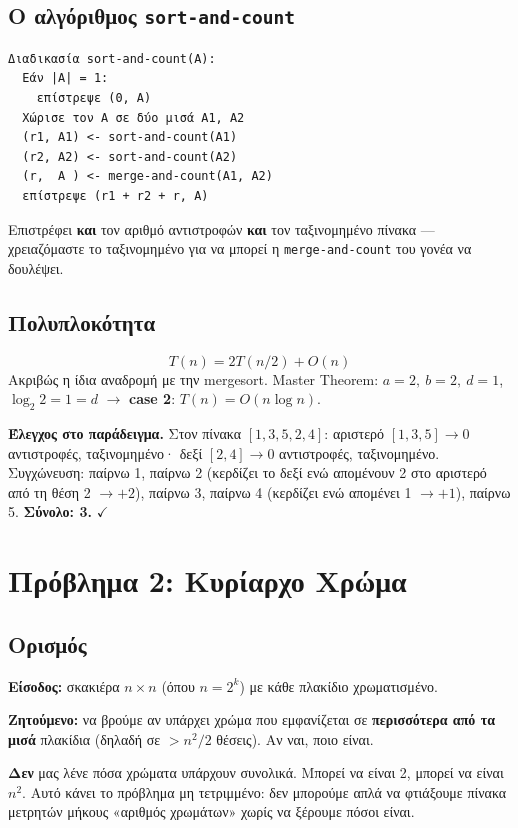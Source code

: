 \documentclass[11pt,a4paper]{article}
\begin{document}
\subsection{Ο αλγόριθμος \texttt{sort-and-count}}

\begin{codebox}
\begin{verbatim}
Διαδικασία sort-and-count(A):
  Εάν |A| = 1:
    επίστρεψε (0, A)
  Χώρισε τον A σε δύο μισά A1, A2
  (r1, A1) <- sort-and-count(A1)
  (r2, A2) <- sort-and-count(A2)
  (r,  A ) <- merge-and-count(A1, A2)
  επίστρεψε (r1 + r2 + r, A)
\end{verbatim}
\end{codebox}
Επιστρέφει \textbf{και} τον αριθμό αντιστροφών \textbf{και} τον ταξινομημένο
πίνακα --- χρειαζόμαστε το ταξινομημένο για να μπορεί η \texttt{merge-and-count}
του γονέα να δουλέψει.

\subsection{Πολυπλοκότητα}

\[
T(n) = 2 T(n/2) + O(n)
\]
Ακριβώς η ίδια αναδρομή με την mergesort. Master Theorem: $a = 2,\ b = 2,\
d = 1$, $\log_2 2 = 1 = d$ $\to$ \textbf{case 2}: $T(n) = O(n \log n)$.

\textbf{Έλεγχος στο παράδειγμα.} Στον πίνακα $[1, 3, 5, 2, 4]$: αριστερό
$[1, 3, 5] \to 0$ αντιστροφές, ταξινομημένο· δεξί $[2, 4] \to 0$ αντιστροφές,
ταξινομημένο. Συγχώνευση: παίρνω 1, παίρνω 2 (κερδίζει το δεξί ενώ απομένουν 2
στο αριστερό από τη θέση 2 $\to +2$), παίρνω 3, παίρνω 4 (κερδίζει ενώ απομένει 1
$\to +1$), παίρνω 5. \textbf{Σύνολο: 3.} $\checkmark$

\section{Πρόβλημα 2: Κυρίαρχο Χρώμα}

\subsection{Ορισμός}

\textbf{Είσοδος:} σκακιέρα $n \times n$ (όπου $n = 2^k$) με κάθε πλακίδιο
χρωματισμένο.

\textbf{Ζητούμενο:} να βρούμε αν υπάρχει χρώμα που εμφανίζεται σε
\textbf{περισσότερα από τα μισά} πλακίδια (δηλαδή σε $> n^2 / 2$ θέσεις). Αν ναι,
ποιο είναι.

\begin{notebox}
\textbf{Δεν} μας λένε πόσα χρώματα υπάρχουν συνολικά. Μπορεί να είναι 2, μπορεί
να είναι $n^2$. Αυτό κάνει το πρόβλημα μη τετριμμένο: δεν μπορούμε απλά να
φτιάξουμε πίνακα μετρητών μήκους «αριθμός χρωμάτων» χωρίς να ξέρουμε πόσοι είναι.
\end{notebox}
\end{document}

